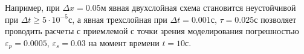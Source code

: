 Например, при $\Delta x=0.05$м явная двухслойная схема становится неустойчивой при $\Delta t \ge 5 \cdot 10^{-5}$с, а явная
трехслойная при $\Delta t=0.001$с, $\tau=0.025$с позволяет проводить расчеты с приемлемой с точки зрения моделирования
погрешностью $\varepsilon_p=0.0005$, $\varepsilon_s=0.03$ на момент времени $t=10$с.